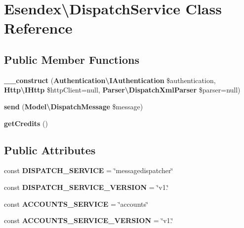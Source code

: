 \section{Esendex\textbackslash{}Dispatch\-Service Class Reference}
\label{class_esendex_1_1_dispatch_service}
\subsection*{Public Member Functions}
\begin{DoxyCompactItemize}
\item 
{\bf \-\_\-\-\_\-construct} ({\bf Authentication\textbackslash{}\-I\-Authentication} \$authentication, {\bf Http\textbackslash{}\-I\-Http} \$http\-Client=null, {\bf Parser\textbackslash{}\-Dispatch\-Xml\-Parser} \$parser=null)
\item 
{\bf send} ({\bf Model\textbackslash{}\-Dispatch\-Message} \$message)
\item 
{\bf get\-Credits} ()
\end{DoxyCompactItemize}
\subsection*{Public Attributes}
\begin{DoxyCompactItemize}
\item 
const {\bfseries D\-I\-S\-P\-A\-T\-C\-H\-\_\-\-S\-E\-R\-V\-I\-C\-E} = \char`\"{}messagedispatcher\char`\"{}\label{class_esendex_1_1_dispatch_service_af3e3825c58817727e5d70a2203faa9b2}

\item 
const {\bfseries D\-I\-S\-P\-A\-T\-C\-H\-\_\-\-S\-E\-R\-V\-I\-C\-E\-\_\-\-V\-E\-R\-S\-I\-O\-N} = \char`\"{}v1.\char`\"{}\label{class_esendex_1_1_dispatch_service_a422257d2684e73afe651b3ef82210405}

\item 
const {\bfseries A\-C\-C\-O\-U\-N\-T\-S\-\_\-\-S\-E\-R\-V\-I\-C\-E} = \char`\"{}accounts\char`\"{}\label{class_esendex_1_1_dispatch_service_a1daa823b6057232ea80787843b788e0e}

\item 
const {\bfseries A\-C\-C\-O\-U\-N\-T\-S\-\_\-\-S\-E\-R\-V\-I\-C\-E\-\_\-\-V\-E\-R\-S\-I\-O\-N} = \char`\"{}v1.\char`\"{}\label{class_esendex_1_1_dispatch_service_a371da18df7de342a13d2379184785353}

\end{DoxyCompactItemize}


